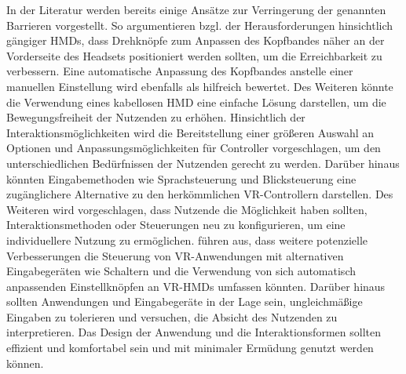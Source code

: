 In der Literatur werden bereits einige Ansätze zur Verringerung der genannten Barrieren vorgestellt. So argumentieren \citet{10.1145/3373625.3416998} bzgl. der Herausforderungen hinsichtlich gängiger HMDs, dass Drehknöpfe zum Anpassen des Kopfbandes näher an der Vorderseite des Headsets positioniert werden sollten, um die Erreichbarkeit zu verbessern. Eine automatische Anpassung des Kopfbandes anstelle einer manuellen Einstellung wird ebenfalls als hilfreich bewertet. Des Weiteren könnte die Verwendung eines kabellosen HMD eine einfache Lösung darstellen, um die Bewegungsfreiheit der Nutzenden zu erhöhen. Hinsichtlich der Interaktionsmöglichkeiten wird die Bereitstellung einer größeren Auswahl an Optionen und Anpassungsmöglichkeiten für Controller vorgeschlagen, um den unterschiedlichen Bedürfnissen der Nutzenden gerecht zu werden. Darüber hinaus könnten Eingabemethoden wie Sprachsteuerung und Blicksteuerung eine zugänglichere Alternative zu den herkömmlichen VR-Controllern darstellen. Des Weiteren wird vorgeschlagen, dass Nutzende die Möglichkeit haben sollten, Interaktionsmethoden oder Steuerungen neu zu konfigurieren, um eine individuellere Nutzung zu ermöglichen. \citet{10.1007/978-3-030-21607-8_3} führen aus, dass weitere potenzielle Verbesserungen die Steuerung von VR-Anwendungen mit alternativen Eingabegeräten wie Schaltern und die Verwendung von sich automatisch anpassenden Einstellknöpfen an VR-HMDs umfassen könnten. Darüber hinaus sollten Anwendungen und Eingabegeräte in der Lage sein, ungleichmäßige Eingaben zu tolerieren und versuchen, die Absicht des Nutzenden zu interpretieren. Das Design der Anwendung und die Interaktionsformen sollten effizient und komfortabel sein und mit minimaler Ermüdung genutzt werden können.

